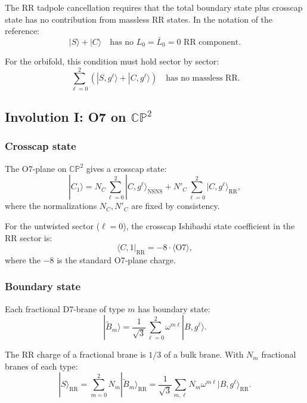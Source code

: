 \documentclass[11pt]{article}
\newcommand{\CP}{\mathbb{CP}}
\begin{document}
The RR tadpole cancellation requires that the total boundary state plus crosscap state has no contribution from massless RR states. In the notation of the reference:
\begin{equation}
|S\rangle + |C\rangle \quad \text{has no } L_0 = \bar{L}_0 = 0 \text{ RR component}.
\end{equation}

For the orbifold, this condition must hold sector by sector:
\begin{equation}
\sum_{\ell=0}^{2} \left( |S, g^\ell\rangle + |C, g^\ell\rangle \right) \quad \text{has no massless RR}.
\end{equation}

\subsection{Involution I: O7 on $\CP^2$}

\subsubsection{Crosscap state}

The O7-plane on $\CP^2$ gives a crosscap state:
\begin{equation}
|C_1\rangle = N_C \sum_{\ell=0}^{2} |C, g^\ell\rangle_{\text{NSNS}} + N'_C \sum_{\ell=0}^{2} |C, g^\ell\rangle_{\text{RR}},
\end{equation}
where the normalizations $N_C, N'_C$ are fixed by consistency.

For the untwisted sector ($\ell = 0$), the crosscap Ishibashi state coefficient in the RR sector is:
\begin{equation}
\langle C, 1|_{\text{RR}} = -8 \cdot \langle \text{O7}\rangle,
\end{equation}
where the $-8$ is the standard O7-plane charge.

\subsubsection{Boundary state}

Each fractional D7-brane of type $m$ has boundary state:
\begin{equation}
|\tilde{B}_m\rangle = \frac{1}{\sqrt{3}} \sum_{\ell=0}^{2} \omega^{m\ell} |B, g^\ell\rangle.
\end{equation}

The RR charge of a fractional brane is $1/3$ of a bulk brane. With $N_m$ fractional branes of each type:
\begin{equation}
|S\rangle_{\text{RR}} = \sum_{m=0}^{2} N_m |\tilde{B}_m\rangle_{\text{RR}} = \frac{1}{\sqrt{3}} \sum_{m,\ell} N_m \omega^{m\ell} |B, g^\ell\rangle_{\text{RR}}.
\end{equation}
\end{document}
